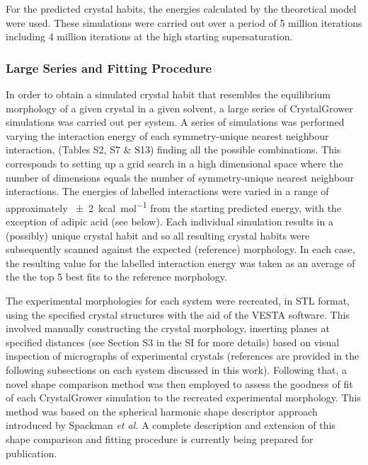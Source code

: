 \documentclass[twoside,twocolumn,9pt]{article}
\begin{document}
For the predicted crystal habits, the energies calculated by the theoretical model were used. These simulations were carried out over a period of 5 million iterations including 4 million iterations at the high starting supersaturation. 

\subsubsection{Large Series and Fitting Procedure}

In order to obtain a simulated crystal habit that resembles the equilibrium morphology of a given crystal in a given solvent, a large series of CrystalGrower simulations was carried out per system. 
A series of simulations was performed varying the interaction energy of each symmetry-unique nearest neighbour interaction, (Tables S2, S7 \& S13) finding all the possible combinations. 
This corresponds to setting up a grid search in a high dimensional space where the number of dimensions equals the number of symmetry-unique nearest neighbour interactions. The energies of labelled interactions were varied in a range of approximately \qty{\pm 2}{kcal.mol^{-1}} from the starting predicted energy, with the exception of adipic acid (see below). 
Each individual simulation results in a (possibly) unique crystal habit and so all resulting crystal habits were subsequently scanned against the expected (reference) morphology. In each case, the resulting value for the labelled interaction energy was taken as an average of the the top 5 best fits to the reference morphology.

The experimental morphologies for each system were recreated, in STL format, 
using the specified crystal structures with the aid of the VESTA software.\cite{Vesta2011} 
This involved manually constructing the crystal morphology, inserting planes at specified distances
(see Section S3 in the SI for more details) based on visual inspection of micrographs of experimental crystals 
(references are provided in the following subsections on each system discussed in this work).
Following that, a novel shape comparison method was then employed to assess the goodness of fit 
of each CrystalGrower simulation to the recreated experimental morphology. This method was 
based on the spherical harmonic shape descriptor approach introduced by Spackman \textit{et al.}\cite{Spackman2016,Spackman2019} 
A complete description and extension of this shape comparison and fitting procedure is currently being prepared for publication.
\end{document}
